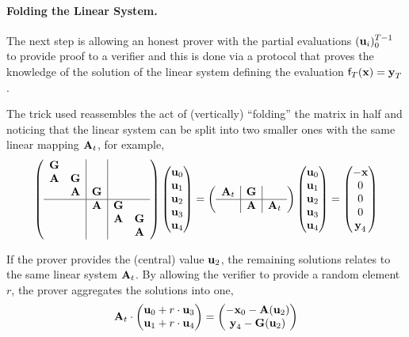 \paragraph{Folding the Linear System.}
The next step is allowing an honest prover with the partial evaluations
$(\vu[i])_{0}^{T-1}$ to provide proof to a verifier and this is done via a protocol that
proves the knowledge of the solution of the linear system defining the evaluation
$\ffun[T]{\vx}= \vy[T]$.

The trick used reassembles the act of (vertically) ``folding'' the matrix in half and noticing that
the linear system can be split into two smaller ones with the same linear mapping $\vA[t]$, for example,
\[
	\left(
		\begin{array}{cc|c|cc}
			\vG  & & & & \\
			\vA & \vG  & & & \\
			 & \vA & \vG  & & \\
			 \hline
			 & & \vA & \vG  & \\
			 & & & \vA & \vG  \\
			 & & & & \vA
		\end{array}
	\right)
	\begin{pmatrix}
	 \vu[0] \\ \vu[1] \\ \vu[2] \\ \vu[3] \\ \vu[4]
	\end{pmatrix}
	=
	\left(
		\begin{array}{c|c|c}
			\vA[t] & \vG  &  \\
			 \hline
			 & \vA & \vA[t]
		\end{array}
	\right)
	\begin{pmatrix}
	 \vu[0] \\ \vu[1] \\ \vu[2] \\ \vu[3] \\ \vu[4]
	\end{pmatrix}
	= 
	\begin{pmatrix}
	 - \vx\\ 0 \\ 0 \\ 0 \\ \vy[4]
	\end{pmatrix}
\]

If the prover provides the (central) value $\vu[2]$, the remaining solutions relates to the same
linear system $\vA[t]$.
By allowing the verifier to provide a random element $r$, the prover aggregates the solutions into one,
\[ \vA[t] \cdot
	\begin{pmatrix}
	 \vu[0] + r \cdot \vu[3] \\ \vu[1] + r \cdot \vu[4]
	\end{pmatrix}
	=
	\begin{pmatrix}
	 - \vx[0] - \vA(\vu[2]) \\ \vy[4] - \vG(\vu[2])
	\end{pmatrix}\]

